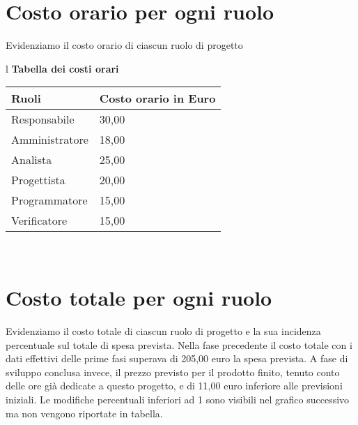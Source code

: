 \section{Costo orario per ogni ruolo}
Evidenziamo il costo orario di ciascun ruolo di progetto
\begin{table}[hbtp]
\large{
\begin{tabular}{l}
\Large{\textbf{\textsf{Tabella dei costi orari}}} \\

\begin{tabular}{||p{6cm}||p{5cm}||}
\hline
\textbf{Ruoli} & \textbf{Costo orario in Euro}\\
\hline
{Responsabile}&30,00\\ 
\hline 
{Amministratore} &18,00\\ 
\hline
{Analista} &25,00 \\
\hline
{Progettista} &20,00 \\
\hline
{Programmatore} &15,00\\
\hline
{Verificatore} &15,00 \\
\hline

\end{tabular} \\
\end{tabular}
}
\end{table}

\section{Costo totale per ogni ruolo}
Evidenziamo il costo totale di ciascun ruolo di progetto e la sua incidenza percentuale sul totale di spesa prevista. Nella fase precedente il costo totale con i dati effettivi delle prime fasi superava di 205,00 euro la spesa prevista. A fase di sviluppo conclusa invece, il prezzo previsto per il prodotto finito, tenuto conto delle ore gi\`a dedicate a questo progetto, e di 11,00 euro inferiore alle previsioni iniziali. Le modifiche percentuali inferiori ad 1 sono visibili nel grafico successivo ma non vengono riportate in tabella.

